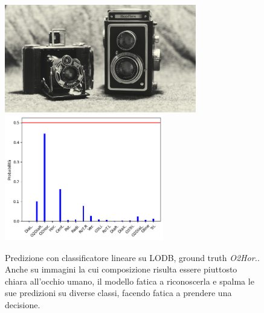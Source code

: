 \begin{figure}[p]
    \centering
    \includegraphics[height=47mm, valign=t]{Immagini/risultati/shcolsson33210898488.jpg}
    \includegraphics[height=55mm, valign=t]{Immagini/risultati/lodb_154_prob.png}
    \caption{Predizione con classificatore lineare su LODB, ground truth \textit{O2Hor.}. Anche su immagini la cui composizione risulta essere piuttosto chiara all'occhio umano, il modello fatica a riconoscerla e spalma le sue predizioni su diverse classi, facendo fatica a prendere una decisione. }
    \label{fig:lodb_prob3}
\end{figure}